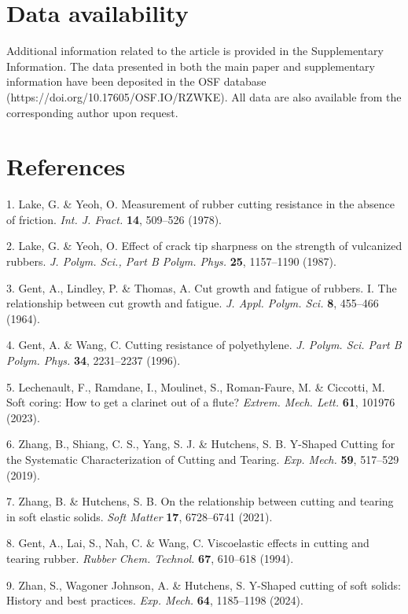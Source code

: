 \documentclass{article}
\begin{document}
\section*{Data availability}

Additional information related to the article is provided in the Supplementary Information. The data presented in both the main paper and supplementary information have been deposited in the OSF database (https://doi.org/10.17605/OSF.IO/RZWKE). All data are also available from the corresponding author upon request.

\section*{References}

\begin{hangpars}\small
1. Lake, G. \& Yeoh, O. Measurement of rubber cutting resistance in the absence of friction. \emph{Int. J. Fract.} \textbf{14}, 509–526 (1978).

2. Lake, G. \& Yeoh, O. Effect of crack tip sharpness on the strength of vulcanized rubbers. \emph{J. Polym. Sci., Part B Polym. Phys.} \textbf{25}, 1157–1190 (1987).

3. Gent, A., Lindley, P. \& Thomas, A. Cut growth and fatigue of rubbers. I. The relationship between cut growth and fatigue. \emph{J. Appl. Polym. Sci.} \textbf{8}, 455–466 (1964).

4. Gent, A. \& Wang, C. Cutting resistance of polyethylene. \emph{J. Polym. Sci. Part B Polym. Phys.} \textbf{34}, 2231–2237 (1996).

5. Lechenault, F., Ramdane, I., Moulinet, S., Roman-Faure, M. \& Ciccotti, M. Soft coring: How to get a clarinet out of a flute? \emph{Extrem. Mech. Lett.} \textbf{61}, 101976 (2023).

6. Zhang, B., Shiang, C. S., Yang, S. J. \& Hutchens, S. B. Y-Shaped Cutting for the Systematic Characterization of Cutting and Tearing. \emph{Exp. Mech.} \textbf{59}, 517–529 (2019).

7. Zhang, B. \& Hutchens, S. B. On the relationship between cutting and tearing in soft elastic solids. \emph{Soft Matter} \textbf{17}, 6728–6741 (2021).

8. Gent, A., Lai, S., Nah, C. \& Wang, C. Viscoelastic effects in cutting and tearing rubber. \emph{Rubber Chem. Technol.} \textbf{67}, 610–618 (1994).

9. Zhan, S., Wagoner Johnson, A. \& Hutchens, S. Y-Shaped cutting of soft solids: History and best practices. \emph{Exp. Mech.} \textbf{64}, 1185–1198 (2024).


\end{hangpars}
\end{document}
